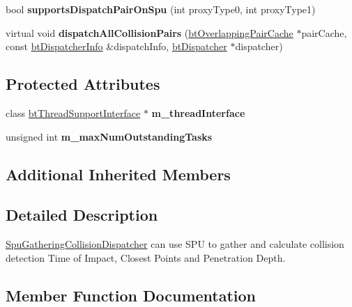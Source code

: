 \begin{DoxyCompactItemize}
\item 
\mbox{\label{classSpuGatheringCollisionDispatcher_a47119970f11e80bd70b322ad2556d1b2}} 
bool {\bfseries supports\+Dispatch\+Pair\+On\+Spu} (int proxy\+Type0, int proxy\+Type1)
\item 
\mbox{\label{classSpuGatheringCollisionDispatcher_aa1f6efc86d17ee8edcf8e19a1a8dba33}} 
virtual void {\bfseries dispatch\+All\+Collision\+Pairs} (\hyperlink{classbtOverlappingPairCache}{bt\+Overlapping\+Pair\+Cache} $\ast$pair\+Cache, const \hyperlink{structbtDispatcherInfo}{bt\+Dispatcher\+Info} \&dispatch\+Info, \hyperlink{classbtDispatcher}{bt\+Dispatcher} $\ast$dispatcher)
\end{DoxyCompactItemize}
\subsection*{Protected Attributes}
\begin{DoxyCompactItemize}
\item 
\mbox{\label{classSpuGatheringCollisionDispatcher_a9ee75db307f5ddce1c27c7256a9b18cb}} 
class \hyperlink{classbtThreadSupportInterface}{bt\+Thread\+Support\+Interface} $\ast$ {\bfseries m\+\_\+thread\+Interface}
\item 
\mbox{\label{classSpuGatheringCollisionDispatcher_ad4f025cdc29b097b53bee70f6c82c6bb}} 
unsigned int {\bfseries m\+\_\+max\+Num\+Outstanding\+Tasks}
\end{DoxyCompactItemize}
\subsection*{Additional Inherited Members}


\subsection{Detailed Description}
\hyperlink{classSpuGatheringCollisionDispatcher}{Spu\+Gathering\+Collision\+Dispatcher} can use S\+PU to gather and calculate collision detection Time of Impact, Closest Points and Penetration Depth. 

\subsection{Member Function Documentation}
\mbox{\label{classSpuGatheringCollisionDispatcher_a320d5506ca57092359f6508f12196ddb}} 
